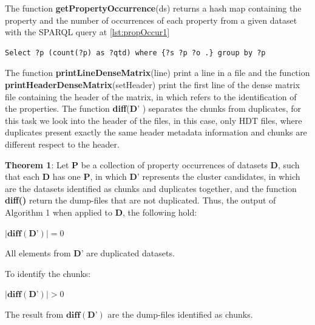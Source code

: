 \documentclass[sw]{iosart2x}
\begin{document}
The function \textbf{getPropertyOccurrence}(ds) returns a hash map containing the property and the number of occurrences of each property from a given dataset with the SPARQL query at \cref{lst:propOccur1} 

\begin{lstlisting}[language=SPARQL, label={lst:propOccur1}, caption=Property occurrence query.]
Select ?p (count(?p) as ?qtd) where {?s ?p ?o .} group by ?p
\end{lstlisting}
The function \textbf{printLineDenseMatrix}(line) print a line in a file and the function \textbf{printHeaderDenseMatrix}(setHeader) print the first line of the dense matrix file containing the header of the matrix, in which refers to the identification of the properties.
The function \textbf{diff}($\mathbf{D’}$ ) separates the chunks from duplicates, for this task we look into the header of the files, in this case, only HDT files, where duplicates present exactly the same header metadata information and chunks are different respect to the header.

\textbf{Theorem 1}: Let $\mathbf{P}$ be a collection of property occurrences of datasets $\mathbf{D}$, such that each $\mathbf{D}$ has one $\mathbf{P}$, in which $\mathbf{D’}$ represents the cluster candidates, in which are the datasets identified as chunks and duplicates together, and the function \textbf{diff()} return the dump-files that are not duplicated. Thus, the output of Algorithm 1 when applied to $\mathbf{D}$, the following hold:

$|\textbf{diff}(\mathbf{D’})| = 0$

All elements from $\mathbf{D’}$ are duplicated datasets.


To identify the chunks:

$|\textbf{diff}(\mathbf{D’})| > 0$


The result from $\textbf{diff}(\mathbf{D’})$ are the dump-files identified as chunks.


\end{document}
